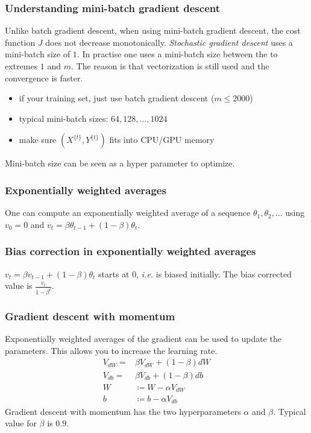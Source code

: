 \documentclass{article}
\begin{document}
\subsubsection{Understanding mini-batch gradient descent}
Unlike batch gradient descent, when using mini-batch gradient descent, the cost function $J$ does not decrease monotonically.
\emph{Stochastic gradient descent} uses a mini-batch size of $1$.
In practise one uses a mini-batch size between the to extremes $1$ and $m$.
The reason is that vectorization is still used and the convergence is faster.
\begin{itemize}
  \item if your training set, just use batch gradient descent ($m\le 2000$)
  \item typical mini-batch sizes: $64,128,\ldots,1024$
  \item make sure $(X^{\{t\}},Y^{\{t\}})$ fits into CPU/GPU memory
\end{itemize}
Mini-batch size can be seen as a hyper parameter to optimize.

\subsubsection{Exponentially weighted averages}
One can compute an exponentially weighted average of a sequence $\theta_1,\theta_2,\ldots$
using $v_0=0$ and $v_t=\beta\theta_{t-1}+(1-\beta)\theta_t$.

\subsubsection{Bias correction in exponentially weighted averages}
$v_t=\beta v_{t-1}+(1-\beta)\theta_t$ starts at $0$, \emph{i.e.} is biased initially.
The bias corrected value is $\frac{v_t}{1-\beta^t}$.

\subsubsection{Gradient descent with momentum}
Exponentially weighted averages of the gradient can be used to update the parameters.
This allows you to increase the learning rate.
\begin{equation}
  \begin{split}
    V_{dW}=&\beta V_{dW}+(1-\beta)dW\\
    V_{db}=&\beta V_{db}+(1-\beta)db\\
    W&\coloneqq W-\alpha V_{dW}\\
    b&\coloneqq b-\alpha V_{db}
  \end{split}
\end{equation}
Gradient descent with momentum has the two hyperparameters $\alpha$ and $\beta$.
Typical value for $\beta$ is $0.9$.
\end{document}
